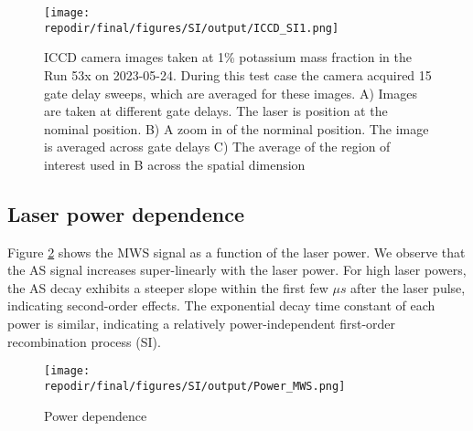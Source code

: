 \begin{figure}[]
\centering
\texttt{[image: \\repodir/final/figures/SI/output/ICCD\_SI1.png]}
\caption{ICCD camera images taken at 1\% potassium mass fraction in the Run 53x on 2023-05-24. During this test case the camera acquired 15 gate delay sweeps, which are averaged for these images. A) Images are taken at different gate delays. The laser is position at the nominal position. B) A zoom in of the norminal position. The image is averaged across gate delays C) The average of the region of interest used in B across the spatial dimension}
\label{fig:SI_536_iccd}
\end{figure}


\subsection{Laser power dependence}

Figure \ref{fig:SI_power_dependence} shows the MWS signal as a function of the laser power. We observe that the AS signal increases super-linearly with the laser power. For high laser powers, the AS decay exhibits a steeper slope within the first few $\mu s$ after the laser pulse, indicating second-order effects. The exponential decay time constant of each power is similar, indicating a relatively power-independent first-order recombination process (SI).

\begin{figure}[h]
    \texttt{[image: \\repodir/final/figures/SI/output/Power\_MWS.png]} 
    \caption{Power dependence}
    \label{fig:SI_power_dependence}
\end{figure}